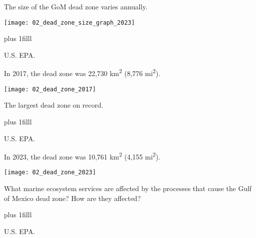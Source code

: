 \documentclass[t]{beamer}
\begin{document}
\begin{frame}[t]{The size of the GoM dead zone varies annually.}

	\texttt{[image: 02\_dead\_zone\_size\_graph\_2023]}
	
	\vskip0pt plus 1filll

\hfill\tiny U.S. EPA.
\end{frame}

%
%	
%	
%

\begin{frame}[t]{In 2017, the dead zone was 22,730 km\textsuperscript{2} (8,776 mi\textsuperscript{2}).}
	
	\texttt{[image: 02\_dead\_zone\_2017]}
	
	{\large The largest dead zone on record.}
	
	\vskip0pt plus 1filll
	
	\hfill\tiny U.S. EPA.
\end{frame}

%
%	
%	
%

\begin{frame}[t]{In 2023, the dead zone was 10,761 km\textsuperscript{2} (4,155 mi\textsuperscript{2}).}
	\vspace{-\baselineskip}
	\begin{center}
		\texttt{[image: 02\_dead\_zone\_2023]}
	\end{center}
	{\large What marine ecosystem services are affected by the processes that cause the Gulf of Mexico dead zone? How are they affected?}
	
	\vskip0pt plus 1filll

\hfill\tiny U.S. EPA.
\end{frame}
\end{document}
